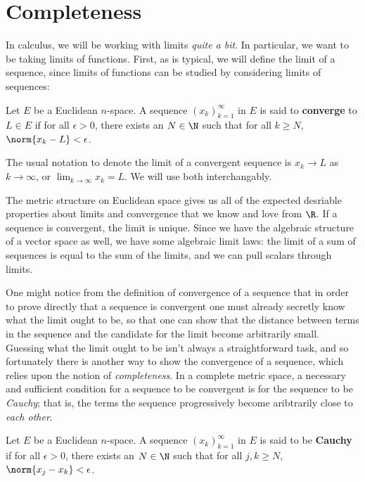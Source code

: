 \section{Completeness}
In calculus, we will be working with limits \emph{quite a bit}. In particular, we want to be taking limits of functions. First, as is typical, we will define the limit of a sequence, since limits of functions can be studied by considering limits of sequences:
\begin{definition}
  Let \( E \) be a Euclidean \( n \)-space. A sequence \( (x_k)_{k=1}^\infty \) in \( E \) is said to \textbf{converge} to \( L\in E \) if for all \( \epsilon>0 \), there exists an \( N\in\N \) such that for all \( k\geq N \), \( \norm{x_k-L}<\epsilon \).
\end{definition}

The usual notation to denote the limit of a convergent sequence is \( x_k\to L \) as \( k\to\infty \), or \( \lim_{k\to\infty}x_k=L \). We will use both interchangably.

\vspace{3mm}

The metric structure on Euclidean space gives us all of the expected desriable properties about limits and convergence that we know and love from \( \R \). If a sequence is convergent, the limit is unique. Since we have the algebraic structure of a vector space as well, we have some algebraic limit laws: the limit of a sum of sequences is equal to the sum of the limits, and we can pull scalars through limits.

\vspace{3mm}

One might notice from the definition of convergence of a sequence that in order to prove directly that a sequence is convergent one must already secretly know what the limit ought to be, so that one can show that the distance between terms in the sequence and the candidate for the limit become arbitrarily small. Guessing what the limit ought to be isn't always a straightforward task, and so fortunately there is another way to show the convergence of a sequence, which relies upon the notion of \emph{completeness}. In a complete metric space, a necessary and sufficient condition for a sequence to be convergent is for the sequence to be \emph{Cauchy}; that is, the terms the sequence progressively become aribtrarily close to \emph{each other}.

\begin{definition}
  Let \( E \) be a Euclidean \( n \)-space. A sequence \( (x_k)_{k=1}^\infty \) in \( E \) is said to be \textbf{Cauchy} if for all \( \epsilon>0 \), there exists an \( N\in\N \) such that for all \( j,k\geq N \), \( \norm{x_j-x_k}<\epsilon \).
\end{definition}

